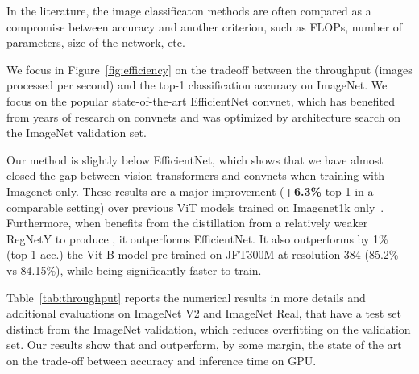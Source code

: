 In the literature, the image classificaton methods are often compared as a compromise between accuracy and another criterion, such as FLOPs, number of parameters, size of the network, etc. 

We focus  in Figure~\ref{fig:efficiency} on the tradeoff between the throughput (images processed per second) and the top-1 classification accuracy on ImageNet. 
We focus on the popular state-of-the-art EfficientNet convnet, which has benefited from years of research on convnets and was optimized by architecture search on the ImageNet validation set. %

Our method \ours is slightly below EfficientNet, which shows that we have almost closed the gap between vision transformers and convnets when training with Imagenet only. These results are a major improvement (\textbf{+6.3\%} top-1 in a comparable setting) over previous ViT models trained on Imagenet1k only~\cite{dosovitskiy2020image}. 
% 
Furthermore, when \ours benefits from the distillation from a relatively weaker RegNetY to produce \oursdis, it outperforms EfficientNet. It also outperforms by 1\% (top-1 acc.) the Vit-B model pre-trained on JFT300M at resolution 384 (85.2\% vs  84.15\%), while being significantly faster to train. 

Table~\ref{tab:throughput} reports the numerical results in more details and additional evaluations on ImageNet V2 and ImageNet Real, that have a test set distinct from the ImageNet validation, which reduces overfitting on the validation set. Our results show that \oursbasedis and   outperform, by some margin, the state of the art on the trade-off between accuracy and inference time on GPU. 

